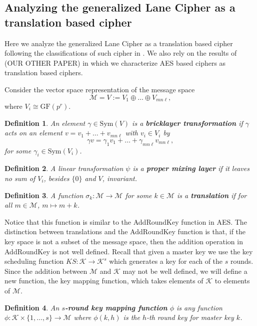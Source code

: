 \documentclass[11pt]{amsart}
\newcommand{\KK}{\mathcal{K}}
\newcommand{\MM}{\mathcal{M}}
\newcommand{\GF}{\mathrm{GF}}
\newcommand{\Sym}{\text{Sym}}
\newtheorem{definition}{{\bf Definition}}
\begin{document}
\subsection{Analyzing the generalized Lane Cipher as a translation based cipher}

Here we analyze the generalized Lane Cipher as a translation based cipher following the classifications of such cipher in \cite{Caranti}. We also rely on the results of (OUR OTHER PAPER) in which we characterize AES based ciphers as translation based ciphers.

Consider the vector space representation of the message space $$\MM = V := V_1 \oplus \dots \oplus V_{mn\ell},$$ where $V_i \cong \GF(p^r)$.

\begin{definition}
An element $\gamma \in \Sym(V)$ is a {\bf bricklayer transformation} if $\gamma$ acts on an element $v = v_1 + \dots + v_{mn\ell}$ with $v_i \in V_i$ by 
$$ \gamma v = \gamma_1 v_1 + \dots + \gamma_{mn\ell} v_{mn\ell},$$
for some $\gamma_i \in \Sym(V_i)$.
\end{definition}

\begin{definition}
A linear transformation $\psi$ is a {\bf proper mixing layer} if it leaves no sum of $V_i$, besides $\{0\}$ and $V$, invariant.
\end{definition}

\begin{definition}
A function $\sigma_k: \MM \rightarrow \MM$ for some $k \in \MM$ is a {\bf translation} if for all $m \in \MM$, $m \mapsto m + k$.
\end{definition}
Notice that this function is similar to the AddRoundKey function in AES. The distinction between translations and the AddRoundKey function is that, if the key space is not a subset of the message space, then the addition operation in AddRoundKey is not well defined. Recall that given a master key we use the key scheduling function $KS : \KK \rightarrow \KK^s$ which generates a key for each of the $s$ rounds. Since the addition between $\MM$ and $\KK$ may not be well defined, we will define a new function, the key mapping function, which takes elements of $\KK$ to elements of $\MM$.
\begin{definition}
An {\bf $s$-round key mapping function} $\phi$ is any function $\phi : \KK \times \{1, \dots, s\} \rightarrow \MM$ where $\phi(k,h)$ is the $h$-th round key for master key $k$.
\end{definition}
\end{document}
